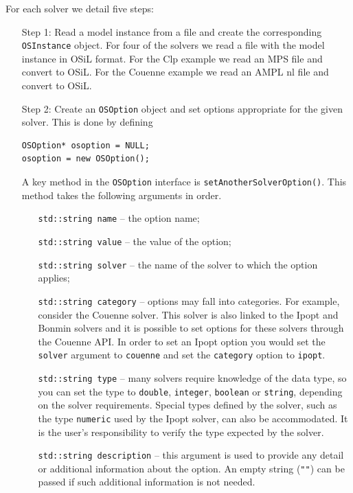 \documentclass[11pt]{article}
\renewcommand{\_}{{\char"5F}}
\renewcommand{\{}{{\char"7B}}
\renewcommand{\}}{{\char"7D}}
\renewcommand{\^}{{\char"0D}}
\renewcommand{\'}{{\char"0D}}
\begin{document}
\begin{enumerate}[Step 1:]
For each solver we detail five steps:

\begin{itemize}
\item[Step 1:]  Read a model instance from a file  and create the corresponding {\tt OSInstance} object.
For four of the solvers we read a file with the model instance in OSiL format. For the Clp example 
we read an MPS file and convert to OSiL. For the Couenne example we read an AMPL nl file and convert 
to OSiL.

\item[Step 2:]  Create an {\tt OSOption} object and set options appropriate for the given solver.   
This is done by defining

\begin{verbatim}
OSOption* osoption = NULL;
osoption = new OSOption();
\end{verbatim}

A key method in the {\tt OSOption} interface is {\tt setAnotherSolverOption()}.  This method 
takes the following arguments in order.

\begin{itemize}
\item[] {\tt std::string name} -- the option name;
\item[] {\tt std::string value}  -- the value of the option;
\item[] {\tt std::string solver} -- the name of the solver to which the option applies;
\item[] {\tt std::string category} -- options may fall into categories. For example, consider the  
Couenne solver.  This solver is also linked to the Ipopt and Bonmin solvers and  it is possible 
to set options for these solvers through the Couenne API. In order to set an Ipopt option 
you would set the {\tt solver} argument to {\tt couenne} and set the {\tt category} option 
to {\tt ipopt}.

\item[] {\tt std::string type} -- many solvers require knowledge of the data type, so you can set 
the type to {\tt double}, {\tt integer}, {\tt boolean} or {\tt string}, depending on the solver 
requirements. Special types defined by the solver, such as the type {\tt numeric} used by the
Ipopt solver, can also be accommodated. It is the user's responsibility to verify the type
expected by the solver.


\item[] {\tt std::string  description} -- this argument is used to provide any detail or 
additional information about the option. An empty string ({\tt""}) can be passed if such additional
information is not needed.
\end{itemize}


\end{itemize}
\end{enumerate}
\end{document}
